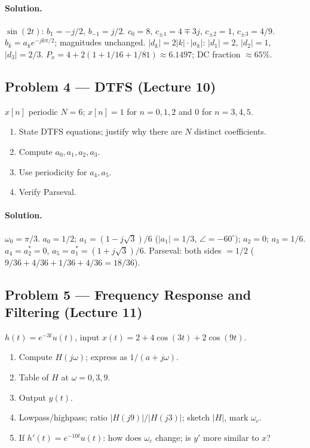 \documentclass[11pt]{article}
\begin{document}
\paragraph{Solution.} $\sin(2t)$: $b_1 = -j/2$, $b_{-1}=j/2$. $c_0=8$, $c_{\pm1}=4\mp 3j$, $c_{\pm 2}=1$, $c_{\pm 3}=4/9$. $b_k = a_k e^{-jk\pi/2}$; magnitudes unchanged. $|d_k| = 2|k|\cdot|a_k|$: $|d_1|=2$, $|d_2|=1$, $|d_3|=2/3$. $P_x = 4 + 2(1+1/16+1/81) \approx 6.1497$; DC fraction $\approx 65\%$.

\subsection{Problem 4 --- DTFS (Lecture 10)}
$x[n]$ periodic $N=6$; $x[n]=1$ for $n=0,1,2$ and $0$ for $n=3,4,5$.
\begin{enumerate}[label=(\alph*)]
  \item State DTFS equations; justify why there are $N$ distinct coefficients.
  \item Compute $a_0,a_1,a_2,a_3$.
  \item Use periodicity for $a_4,a_5$.
  \item Verify Parseval.
\end{enumerate}

\paragraph{Solution.} $\omega_0 = \pi/3$. $a_0 = 1/2$; $a_1 = (1-j\sqrt 3)/6$ ($|a_1|=1/3$, $\angle=-60^\circ$); $a_2 = 0$; $a_3 = 1/6$. $a_4 = a_2^* = 0$, $a_5 = a_1^* = (1+j\sqrt 3)/6$. Parseval: both sides $=1/2$ ($9/36+4/36+1/36+4/36=18/36$).

\subsection{Problem 5 --- Frequency Response and Filtering (Lecture 11)}
$h(t)=e^{-3t}u(t)$, input $x(t) = 2 + 4\cos(3t) + 2\cos(9t)$.
\begin{enumerate}[label=(\alph*)]
  \item Compute $H(j\omega)$; express as $1/(a+j\omega)$.
  \item Table of $H$ at $\omega=0,3,9$.
  \item Output $y(t)$.
  \item Lowpass/highpass; ratio $|H(j9)|/|H(j3)|$; sketch $|H|$, mark $\omega_c$.
  \item If $h'(t)=e^{-10t}u(t)$: how does $\omega_c$ change; is $y'$ more similar to $x$?
\end{enumerate}
\end{document}
